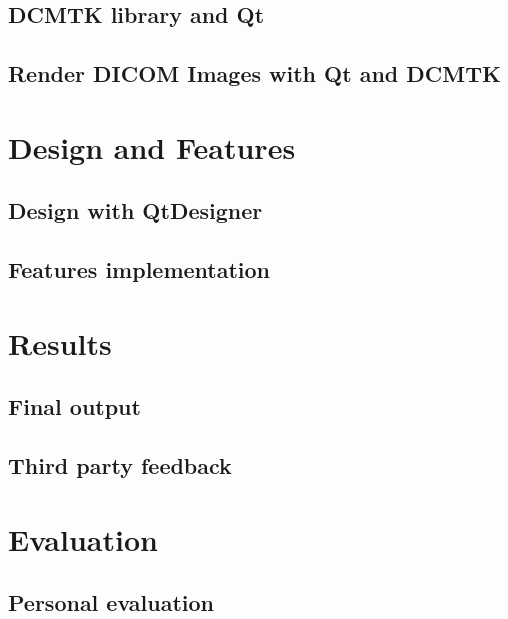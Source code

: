 \documentclass[12pt,twoside]{article}
\begin{document}
\subsection{DCMTK library and Qt}

\clearpage
\subsection{Render DICOM Images with Qt and DCMTK}



\clearpage
\section{Design and Features}
\subsection{Design with QtDesigner}


\clearpage
\subsection{Features implementation}




\clearpage


\section{Results}
\clearpage
\subsection{Final output}


\clearpage
\subsection{Third party feedback}



\clearpage


\section{Evaluation}

\clearpage
\subsection{Personal evaluation}

\end{document}

